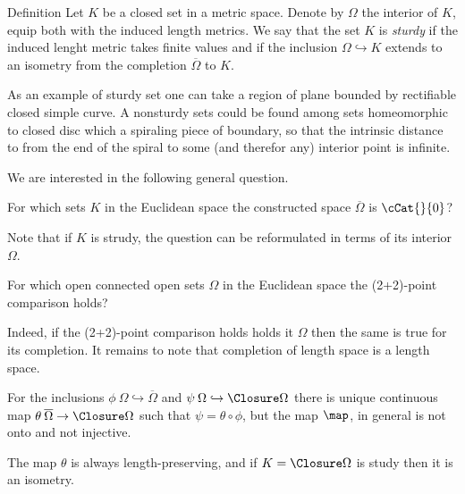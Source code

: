 \begin{thm}{Definition}
Let $K$ be a closed set in a metric space.
Denote by $\Omega$ the interior of $K$, equip both with the induced length metrics.
We say that the set $K$ is \emph{sturdy} if the induced lenght metric takes finite values and 
if the inclusion $\Omega\hookrightarrow K$ extends to an isometry
from the completion $\overline \Omega$ to $K$.
\end{thm}

As an example of sturdy set one can take a region of plane bounded by rectifiable closed simple curve.
A nonsturdy sets could be found among sets homeomorphic to closed disc 
which a spiraling piece of boundary, so that the intrinsic distance to from the end of the spiral to some (and therefor any) interior point is infinite. 

We are interested in the following general question.

\begin{clm}{}
For which sets $K$ in the Euclidean space 
the constructed space $\overline\Omega$ is $\cCat{}{0}$? 
\end{clm}

Note that if $K$ is strudy, the question can be reformulated in terms of its interior $\Omega$.

\begin{clm}{}
For which open connected open sets $\Omega$ in the Euclidean space 
the (2+2)-point comparison holds?
\end{clm}

Indeed, if the (2+2)-point comparison holds holds it $\Omega$ then the same is true for its completion. 
It remains to note that completion of length space is a length space.

For the inclusions $\phi\:\Omega\hookrightarrow\overline\Omega$ and $\psi\:\Omega\hookrightarrow\Closure\Omega$ there is unique continuous map 
$\theta\:\overline\Omega\to\Closure\Omega$ such that $\psi=\theta\circ\phi$,
but the map $\map$, in general is not onto and not injective.

The map $\theta$ is always length-preserving, and if $K=\Closure\Omega$ is study then it is an isometry.

















